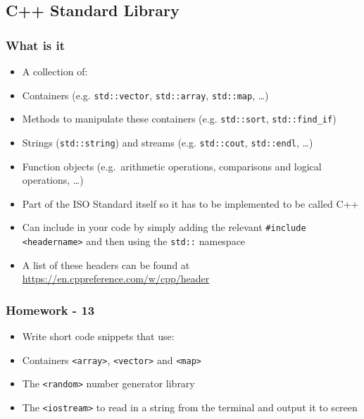 \subsection{C++ Standard Library}\label{c-standard-library}

\subsubsection{What is it}\label{what-is-it}

\begin{itemize}
\item
  A collection of:
\item
  Containers (e.g. \texttt{std::vector}, \texttt{std::array},
  \texttt{std::map}, \ldots{})
\item
  Methods to manipulate these containers (e.g. \texttt{std::sort},
  \texttt{std::find\_if})
\item
  Strings (\texttt{std::string}) and streams (e.g. \texttt{std::cout},
  \texttt{std::endl}, \ldots{})
\item
  Function objects (e.g.~arithmetic operations, comparisons and logical
  operations, \ldots{})
\item
  Part of the ISO Standard itself so it has to be implemented to be
  called C++
\item
  Can include in your code by simply adding the relevant
  \texttt{\#include \textless{}headername\textgreater{}} and then using
  the \texttt{std::} namespace
\item
  A list of these headers can be found at
  \url{https://en.cppreference.com/w/cpp/header}
\end{itemize}

\subsubsection{Homework - 13}\label{homework---13}

\begin{itemize}
\itemsep1pt\parskip0pt
\item
  Write short code snippets that use:
\item
  Containers \texttt{\textless{}array\textgreater{}},
  \texttt{\textless{}vector\textgreater{}} and
  \texttt{\textless{}map\textgreater{}}\\
\item
  The \texttt{\textless{}random\textgreater{}} number generator library
\item
  The \texttt{\textless{}iostream\textgreater{}} to read in a string
  from the terminal and output it to screen
\end{itemize}

